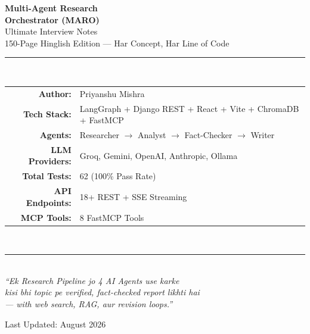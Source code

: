 \documentclass[11pt,a4paper,twoside]{report}
\begin{document}
\begin{titlepage}
\centering
\vspace*{1.5cm}

{\Huge\bfseries\color{sectioncolor} Multi-Agent Research\\[0.3cm] Orchestrator (MARO)}\\[1cm]
{\LARGE\color{purpleaccent} Ultimate Interview Notes}\\[0.3cm]
{\Large\color{gray} 150-Page Hinglish Edition --- Har Concept, Har Line of Code}\\[1.5cm]

\rule{\textwidth}{1.5pt}\\[0.4cm]
{\large
\begin{tabular}{rl}
\textbf{Author:} & Priyanshu Mishra \\[0.15cm]
\textbf{Tech Stack:} & LangGraph + Django REST + React + Vite + ChromaDB + FastMCP \\[0.15cm]
\textbf{Agents:} & Researcher $\rightarrow$ Analyst $\rightarrow$ Fact-Checker $\rightarrow$ Writer \\[0.15cm]
\textbf{LLM Providers:} & Groq, Gemini, OpenAI, Anthropic, Ollama \\[0.15cm]
\textbf{Total Tests:} & 62 (100\% Pass Rate) \\[0.15cm]
\textbf{API Endpoints:} & 18+ REST + SSE Streaming \\[0.15cm]
\textbf{MCP Tools:} & 8 FastMCP Tools \\[0.15cm]
\end{tabular}
}\\[0.4cm]
\rule{\textwidth}{1.5pt}\\[1.5cm]

{\large\color{gray}\textit{``Ek Research Pipeline jo 4 AI Agents use karke\\kisi bhi topic pe verified, fact-checked report likhti hai\\--- with web search, RAG, aur revision loops.''}}\\[1.5cm]


\vfill
{\small Last Updated: August 2026}
\end{titlepage}
\end{document}
